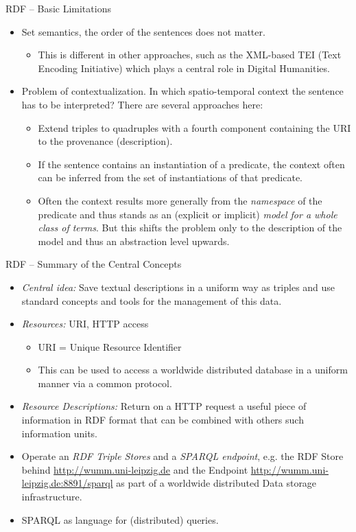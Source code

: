 \documentclass{beamer}
\begin{document}
\begin{frame}{RDF -- Basic Limitations}
\begin{itemize}
\item Set semantics, the order of the sentences does not matter.
  \begin{itemize}
  \item This is different in other approaches, such as the XML-based TEI (Text
    Encoding Initiative) which plays a central role in Digital Humanities.
  \end{itemize}
\item Problem of contextualization. In which spatio-temporal context the
  sentence has to be interpreted? There are several approaches here:
  \begin{itemize}
  \item Extend triples to quadruples with a fourth component containing the
    URI to the provenance (description).
  \item If the sentence contains an instantiation of a predicate, the context
    often can be inferred from the set of instantiations of that predicate.
  \item Often the context results more generally from the \emph{namespace} of
    the predicate and thus stands as an (explicit or implicit) \emph{model for
      a whole class of terms}.  But this shifts the problem only to the
    description of the model and thus an abstraction level upwards.
  \end{itemize}
\end{itemize}
\end{frame}
\begin{frame}{RDF -- Summary of the Central Concepts}
\begin{itemize}
\item \emph{Central idea:} Save textual descriptions in a uniform way as
  triples and use standard concepts and tools for the management of this data.
\item \emph{Resources:} URI, HTTP access
  \begin{itemize}
  \item URI = Unique Resource Identifier
  \item This can be used to access a worldwide distributed database in a
    uniform manner via a common protocol.
  \end{itemize}
\item \emph{Resource Descriptions:} Return on a HTTP request a useful piece of
  information in RDF format that can be combined with others such information
  units.
\item Operate an \emph{RDF Triple Stores} and a \emph{SPARQL endpoint}, e.g.
  the RDF Store behind \url{http://wumm.uni-leipzig.de} and the Endpoint
  \url{http://wumm.uni-leipzig.de:8891/sparql} as part of a worldwide
  distributed Data storage infrastructure.
\item SPARQL as language for (distributed) queries.
\end{itemize}
\end{frame}
\end{document}
